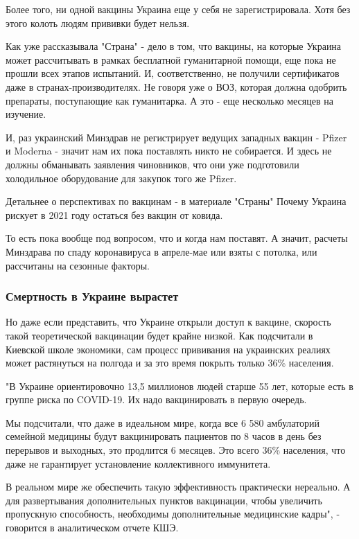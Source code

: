 Более того, ни одной вакцины Украина еще у себя не зарегистрировала. Хотя без этого колоть людям прививки будет нельзя. 

Как уже рассказывала "Страна" - дело в том, что вакцины, на которые Украина
может рассчитывать в рамках бесплатной гуманитарной помощи, еще пока не прошли
всех этапов испытаний. И, соответственно, не получили сертификатов даже в
странах-производителях. Не говоря уже о ВОЗ, которая должна одобрить препараты,
поступающие как гуманитарка. А это - еще несколько месяцев на изучение. 

И, раз украинский Минздрав не регистрирует ведущих западных вакцин - Pfizer и
Moderna - значит нам их пока поставлять никто не собирается. И здесь не должны
обманывать заявления чиновников, что они уже подготовили холодильное
оборудование для закупок того же Pfizer. 

Детальнее о перспективах по вакцинам - в материале "Страны" Почему Украина
рискует в 2021 году остаться без вакцин от ковида.

То есть пока вообще под вопросом, что и когда нам поставят. А значит, расчеты
Минздрава по спаду коронавируса в апреле-мае или взяты с потолка, или
рассчитаны на сезонные факторы. 

\subsubsection{Смертность в Украине вырастет}

Но даже если представить, что Украине открыли доступ к вакцине, скорость такой
теоретической вакцинации будет крайне низкой. Как подсчитали в Киевской школе
экономики, сам процесс прививания на украинских реалиях может растянуться на
полгода и за это время покрыть только 36\% населения. 

"В Украине ориентировочно 13,5 миллионов людей старше 55 лет, которые есть в
группе риска по COVID-19. Их надо вакцинировать в первую очередь.

Мы подсчитали, что даже в идеальном мире, когда все 6 580 амбулаторий семейной
медицины будут вакцинировать пациентов по 8 часов в день без перерывов и
выходных, это продлится 6 месяцев. Это всего 36\% населения, что даже не
гарантирует установление коллективного иммунитета.

В реальном мире же обеспечить такую эффективность практически нереально. А для
развертывания дополнительных пунктов вакцинации, чтобы увеличить пропускную
способность, необходимы дополнительные медицинские кадры", - говорится в
аналитическом отчете КШЭ. 

